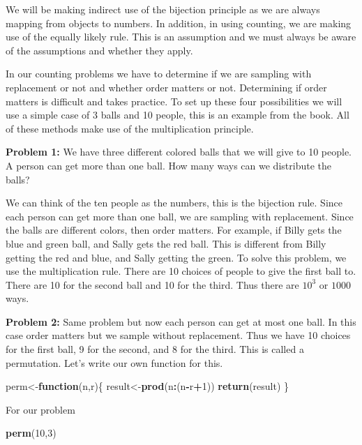 \documentclass[]{book}
\newenvironment{Shaded}{\begin{snugshade}}{\end{snugshade}}
\newcommand{\KeywordTok}[1]{\textcolor[rgb]{0.13,0.29,0.53}{\textbf{#1}}}
\newcommand{\DecValTok}[1]{\textcolor[rgb]{0.00,0.00,0.81}{#1}}
\newcommand{\ControlFlowTok}[1]{\textcolor[rgb]{0.13,0.29,0.53}{\textbf{#1}}}
\newcommand{\OperatorTok}[1]{\textcolor[rgb]{0.81,0.36,0.00}{\textbf{#1}}}
\newcommand{\NormalTok}[1]{#1}
\theoremstyle{definition}
\theoremstyle{definition}
\theoremstyle{definition}
\theoremstyle{remark}
\begin{document}
We will be making indirect use of the bijection principle as we are
always mapping from objects to numbers. In addition, in using counting,
we are making use of the equally likely rule. This is an assumption and
we must always be aware of the assumptions and whether they apply.

In our counting problems we have to determine if we are sampling with
replacement or not and whether order matters or not. Determining if
order matters is difficult and takes practice. To set up these four
possibilities we will use a simple case of 3 balls and 10 people, this
is an example from the book. All of these methods make use of the
multiplication principle.

\textbf{Problem 1:} We have three different colored balls that we will
give to 10 people. A person can get more than one ball. How many ways
can we distribute the balls?

We can think of the ten people as the numbers, this is the bijection
rule. Since each person can get more than one ball, we are sampling with
replacement. Since the balls are different colors, then order matters.
For example, if Billy gets the blue and green ball, and Sally gets the
red ball. This is different from Billy getting the red and blue, and
Sally getting the green. To solve this problem, we use the
multiplication rule. There are 10 choices of people to give the first
ball to. There are 10 for the second ball and 10 for the third. Thus
there are \(10^3\) or \(1000\) ways.

\textbf{Problem 2:} Same problem but now each person can get at most one
ball. In this case order matters but we sample without replacement. Thus
we have 10 choices for the first ball, 9 for the second, and 8 for the
third. This is called a permutation. Let's write our own function for
this.

\begin{Shaded}
\begin{Highlighting}[]
\NormalTok{perm<-}\ControlFlowTok{function}\NormalTok{(n,r)\{}
\NormalTok{    result<-}\KeywordTok{prod}\NormalTok{(n}\OperatorTok{:}\NormalTok{(n}\OperatorTok{-}\NormalTok{r}\OperatorTok{+}\DecValTok{1}\NormalTok{))}
    \KeywordTok{return}\NormalTok{(result)}
\NormalTok{\}}
\end{Highlighting}
\end{Shaded}

For our problem

\begin{Shaded}
\begin{Highlighting}[]
\KeywordTok{perm}\NormalTok{(}\DecValTok{10}\NormalTok{,}\DecValTok{3}\NormalTok{)}
\end{Highlighting}
\end{Shaded}
\end{document}
